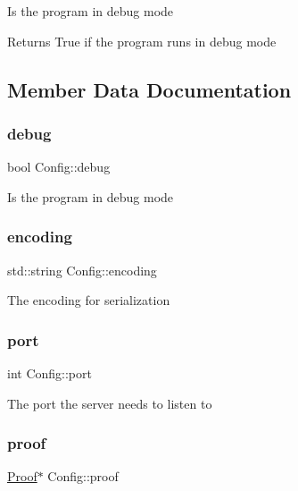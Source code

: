 Is the program in debug mode

\begin{DoxyReturn}{Returns}
True if the program runs in debug mode 
\end{DoxyReturn}


\subsection{Member Data Documentation}
\mbox{\label{classConfig_a8ecbe763ad856693ff85cba5182e1f2e}} 
\subsubsection{\texorpdfstring{debug}{debug}}
{\footnotesize\ttfamily bool Config\+::debug\hspace{0.3cm}{\ttfamily [protected]}}

Is the program in debug mode \mbox{\label{classConfig_a9391a8a86ed88a6fefd35ec89c10e861}} 
\subsubsection{\texorpdfstring{encoding}{encoding}}
{\footnotesize\ttfamily std\+::string Config\+::encoding\hspace{0.3cm}{\ttfamily [protected]}}

The encoding for serialization \mbox{\label{classConfig_a9b99e069f6e78fcb906d5effbb600e97}} 
\subsubsection{\texorpdfstring{port}{port}}
{\footnotesize\ttfamily int Config\+::port\hspace{0.3cm}{\ttfamily [protected]}}

The port the server needs to listen to \mbox{\label{classConfig_ac220c43cceafde6291b29d44f61c3785}} 
\subsubsection{\texorpdfstring{proof}{proof}}
{\footnotesize\ttfamily \mbox{\hyperlink{classProof}{Proof}}$\ast$ Config\+::proof\hspace{0.3cm}{\ttfamily [protected]}}

